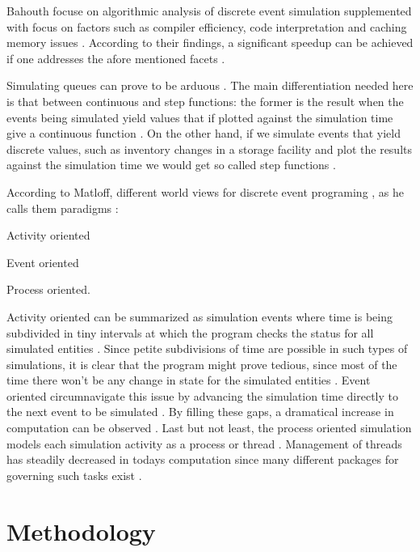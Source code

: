 \documentclass{seal_thesis}
\begin{document}
Bahouth \etal focuse on algorithmic analysis of discrete event simulation supplemented with focus on factors such as compiler efficiency, code interpretation and caching memory issues \cite{Bahouth2007}. According to their findings, a significant speedup can be achieved if one addresses the afore mentioned facets \cite{Bahouth2007}.

Simulating queues can prove to be arduous \cite{Matloff2008}. The main differentiation needed here is that between continuous and step functions: the former is the result when the events being simulated yield values that if plotted against the simulation time give a continuous function \cite{Matloff2008}. On the other hand, if we simulate events that yield discrete values, such as inventory changes in a storage facility and plot the results against the simulation time we would get so called step functions \cite{Matloff2008}.

According to Matloff, different world views for discrete event programing \cite{Matloff2008}, as he calls them paradigms \cite{Matloff2008}:
\begin{enumerate*}
	\item Activity oriented
	\item Event oriented
	\item Process oriented.
\end{enumerate*}

Activity oriented can be summarized as simulation events where time is being subdivided in tiny intervals at which the program checks the status for all simulated entities \cite{Matloff2008}. Since petite subdivisions of time are possible in such types of simulations, it is clear that the program might prove tedious, since most of the time there won't be any change in state for the simulated entities \cite{Matloff2008}. Event oriented circumnavigate this issue by advancing the simulation time directly to the next event to be simulated \cite{Matloff2008}. By filling these gaps, a dramatical increase in computation can be observed \cite{Matloff2008}. Last but not least, the process oriented simulation models each simulation activity as a process or thread \cite{Matloff2008}. Management of threads has steadily decreased in todays computation since many different packages for governing such tasks exist \cite{Matloff2008}.

\chapter{Methodology}
\label{ch:methodology}
\end{document}
